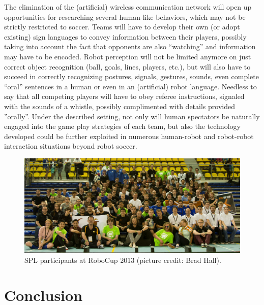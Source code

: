 \documentclass{llncs}
\begin{document}
The elimination of the (artificial) wireless communication network will open up opportunities 
for researching several human-like behaviors, which may not be strictly restricted to soccer. 
Teams will have to develop their own (or adopt existing) sign languages to convey information 
between their players, possibly taking into account the fact that opponents are also 
``watching'' and information may have to be encoded. Robot perception will not be limited 
anymore on just correct object recognition (ball, goals, lines, players, etc.), but will also 
have to succeed in correctly recognizing postures, signals, gestures, sounds, even complete 
``oral'' sentences in a human or even in an (artificial) robot language. Needless to say that 
all competing players will have to obey referee instructions, signaled with the sounds of a 
whistle, possibly complimented with details provided ''orally''. Under the described setting, 
not only will human spectators be naturally engaged into the game play strategies of each 
team, but also the technology developed could be further exploited in numerous human-robot 
and robot-robot interaction situations beyond robot soccer. 



\begin{figure}[t]
\centerline{
\includegraphics[width=\columnwidth]{"spl2013people"}
}
  \caption{SPL participants at RoboCup 2013 (picture credit: Brad Hall).}
  \label{spl2013people}
\vspace{-0.3cm}
\end{figure} 

\section{Conclusion}
\end{document}
